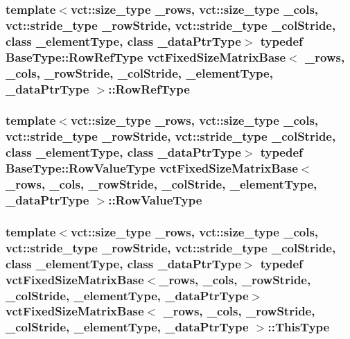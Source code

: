 \subsubsection[{Row\+Ref\+Type}]{\setlength{\rightskip}{0pt plus 5cm}template$<$vct\+::size\+\_\+type \+\_\+rows, vct\+::size\+\_\+type \+\_\+cols, vct\+::stride\+\_\+type \+\_\+row\+Stride, vct\+::stride\+\_\+type \+\_\+col\+Stride, class \+\_\+element\+Type, class \+\_\+data\+Ptr\+Type$>$ typedef {\bf Base\+Type\+::\+Row\+Ref\+Type} {\bf vct\+Fixed\+Size\+Matrix\+Base}$<$ \+\_\+rows, \+\_\+cols, \+\_\+row\+Stride, \+\_\+col\+Stride, \+\_\+element\+Type, \+\_\+data\+Ptr\+Type $>$\+::{\bf Row\+Ref\+Type}}\label{classvct_fixed_size_matrix_base_a99d07082e6588c81902cf19226ebf93b}
\hypertarget{classvct_fixed_size_matrix_base_a63ea40ab7299ff1f714ba077ef1fe568}{}
\subsubsection[{Row\+Value\+Type}]{\setlength{\rightskip}{0pt plus 5cm}template$<$vct\+::size\+\_\+type \+\_\+rows, vct\+::size\+\_\+type \+\_\+cols, vct\+::stride\+\_\+type \+\_\+row\+Stride, vct\+::stride\+\_\+type \+\_\+col\+Stride, class \+\_\+element\+Type, class \+\_\+data\+Ptr\+Type$>$ typedef {\bf Base\+Type\+::\+Row\+Value\+Type} {\bf vct\+Fixed\+Size\+Matrix\+Base}$<$ \+\_\+rows, \+\_\+cols, \+\_\+row\+Stride, \+\_\+col\+Stride, \+\_\+element\+Type, \+\_\+data\+Ptr\+Type $>$\+::{\bf Row\+Value\+Type}}\label{classvct_fixed_size_matrix_base_a63ea40ab7299ff1f714ba077ef1fe568}
\hypertarget{classvct_fixed_size_matrix_base_ad2d0e739023eaf4fe1a77106083eec76}{}
\subsubsection[{This\+Type}]{\setlength{\rightskip}{0pt plus 5cm}template$<$vct\+::size\+\_\+type \+\_\+rows, vct\+::size\+\_\+type \+\_\+cols, vct\+::stride\+\_\+type \+\_\+row\+Stride, vct\+::stride\+\_\+type \+\_\+col\+Stride, class \+\_\+element\+Type, class \+\_\+data\+Ptr\+Type$>$ typedef {\bf vct\+Fixed\+Size\+Matrix\+Base}$<$\+\_\+rows, \+\_\+cols, \+\_\+row\+Stride, \+\_\+col\+Stride, \+\_\+element\+Type, \+\_\+data\+Ptr\+Type$>$ {\bf vct\+Fixed\+Size\+Matrix\+Base}$<$ \+\_\+rows, \+\_\+cols, \+\_\+row\+Stride, \+\_\+col\+Stride, \+\_\+element\+Type, \+\_\+data\+Ptr\+Type $>$\+::{\bf This\+Type}}\label{classvct_fixed_size_matrix_base_ad2d0e739023eaf4fe1a77106083eec76}



